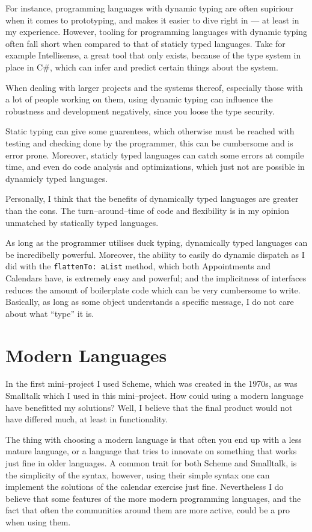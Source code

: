 For instance, programming languages with dynamic typing are often supiriour when it comes to prototyping, and makes it easier to dive right in --- at least in my experience.
However, tooling for programming languages with dynamic typing often fall short when compared to that of staticly typed languages.
Take for example Intellisense, a great tool that only exists, because of the type system in place in C\#, which can infer and predict certain things about the system.

\bigskip
When dealing with larger projects and the systems thereof, especially those with a lot of people working on them,
using dynamic typing can influence the robustness and development negatively, since you loose the type security.

Static typing can give some guarentees, which otherwise must be reached with testing and checking done by the programmer, this can be cumbersome and is error prone.
Moreover, staticly typed languages can catch some errors at compile time, and even do code analysis and optimizations, which just not are possible in dynamicly typed languages.

\bigskip
Personally, I think that the benefits of dynamically typed languages are greater than the cons.
The turn--around--time of code and flexibility is in my opinion unmatched by statically typed languages.

As long as the programmer utilises duck typing, dynamically typed languages can be incredibelly powerful.
Moreover, the ability to easily do dynamic dispatch as I did with the \texttt{flattenTo: aList} method, which both Appointments and Calendars have,
is extremely easy and powerful; and the implicitness of interfaces reduces the amount of boilerplate code which can be very cumbersome to write.
Basically, as long as some object understands a specific message, I do not care about what \enquote{type} it is.

\section{Modern Languages}
In the first mini--project I used Scheme, which was created in the 1970s, as was Smalltalk which I used in this mini--project.
How could using a modern language have benefitted my solutions?
Well, I believe that the final product would not have differed much, at least in functionality.

The thing with choosing a modern language is that often you end up with a less mature language, or a language that tries to innovate on something that works just fine in older languages.
A common trait for both Scheme and Smalltalk, is the simplicity of the syntax, however, using their simple syntax one can implement the solutions of the calendar exercise just fine.
Nevertheless I do believe that some features of the more modern programming languages, and the fact that often the communities around them are more active, could be a pro when using them.

